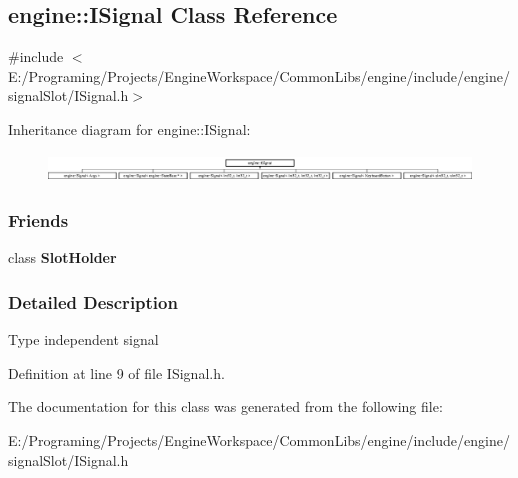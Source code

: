 \hypertarget{a00050}{}\subsection{engine\+:\+:I\+Signal Class Reference}
\label{a00050}


{\ttfamily \#include $<$E\+:/\+Programing/\+Projects/\+Engine\+Workspace/\+Common\+Libs/engine/include/engine/signal\+Slot/\+I\+Signal.\+h$>$}

Inheritance diagram for engine\+:\+:I\+Signal\+:\begin{figure}[H]
\begin{center}
\leavevmode
\includegraphics[height=0.740741cm]{a00050}
\end{center}
\end{figure}
\subsubsection*{Friends}
\begin{DoxyCompactItemize}
\item 
class {\bfseries Slot\+Holder}\hypertarget{a00050_a82af4fee1749e3f4e0b7c5eac6046ef5}{}\label{a00050_a82af4fee1749e3f4e0b7c5eac6046ef5}

\end{DoxyCompactItemize}


\subsubsection{Detailed Description}
Type independent signal 

Definition at line 9 of file I\+Signal.\+h.



The documentation for this class was generated from the following file\+:\begin{DoxyCompactItemize}
\item 
E\+:/\+Programing/\+Projects/\+Engine\+Workspace/\+Common\+Libs/engine/include/engine/signal\+Slot/I\+Signal.\+h\end{DoxyCompactItemize}
